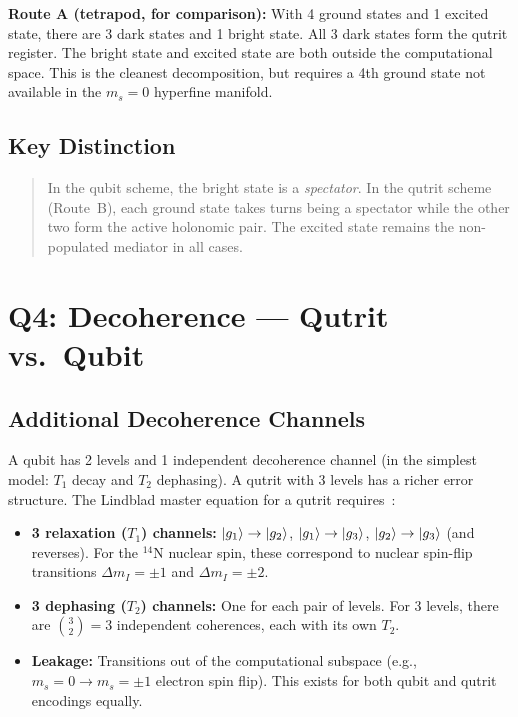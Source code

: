 \documentclass[11pt,letterpaper]{article}
\begin{document}
\textbf{Route A (tetrapod, for comparison):} With 4 ground states and 1 excited state,
there are 3 dark states and 1 bright state. All 3 dark states form the qutrit register.
The bright state and excited state are both outside the computational space. This is the
cleanest decomposition, but requires a 4th ground state not available in the $m_s = 0$
hyperfine manifold.

\subsection{Key Distinction}

\begin{quote}
In the qubit scheme, the bright state is a \emph{spectator}. In the qutrit scheme
(Route~B), each ground state takes turns being a spectator while the other two form the
active holonomic pair. The excited state remains the non-populated mediator in all cases.
\end{quote}


\section{Q4: Decoherence --- Qutrit vs.\ Qubit}
\label{sec:Q4}

\subsection{Additional Decoherence Channels}

A qubit has 2 levels and 1 independent decoherence channel (in the simplest model: $T_1$
decay and $T_2$ dephasing). A qutrit with 3 levels has a richer error structure. The
Lindblad master equation for a qutrit requires~\cite{Candido2024}: %

\begin{itemize}
  \item \textbf{3 relaxation ($T_1$) channels:} $\ket{g_1} \to \ket{g_2}$,
    $\ket{g_1} \to \ket{g_3}$, $\ket{g_2} \to \ket{g_3}$ (and reverses). For the
    $^{14}$N nuclear spin, these correspond to nuclear spin-flip transitions
    $\Delta m_I = \pm 1$ and $\Delta m_I = \pm 2$.
  \item \textbf{3 dephasing ($T_2$) channels:} One for each pair of levels.
    For 3 levels, there are $\binom{3}{2} = 3$ independent coherences, each with its
    own $T_2$.
  \item \textbf{Leakage:} Transitions out of the computational subspace (e.g.,
    $m_s = 0 \to m_s = \pm 1$ electron spin flip). This exists for both qubit and
    qutrit encodings equally.
\end{itemize}
\end{document}
